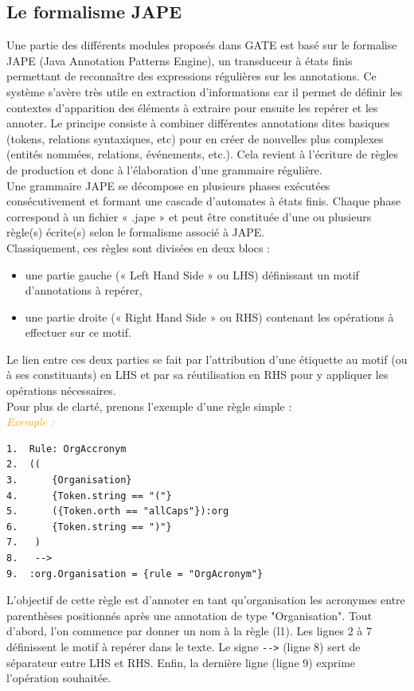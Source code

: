 \documentclass[a4paper, 11pt]{report}
\newenvironment{exemple}
    {
    \textit{\textcolor{orange}{
    Exemple : \\}}
    }
    {~\\
    }
\begin{document}
\subsection{Le formalisme JAPE}
Une partie des différents modules proposés dans GATE est basé sur le formalise JAPE (Java Annotation Patterns Engine), un transduceur à états finis permettant de reconnaître des expressions régulières sur les annotations. Ce système s'avère très utile en extraction d'informations car il permet de définir les contextes d'apparition des éléments à extraire pour ensuite les repérer et les annoter. Le principe consiste à combiner différentes annotations dites basiques (tokens, relations syntaxiques, etc) pour en créer de nouvelles plus complexes (entités nommées, relations, événements, etc.). Cela revient à l'écriture de règles de production et donc à l'élaboration d'une grammaire régulière.\\
Une grammaire JAPE se décompose en plusieurs phases exécutées consécutivement et formant une cascade d'automates à états finis. Chaque phase correspond à un fichier « .jape » et peut être constituée d'une ou plusieurs règle(s) écrite(s) selon le formalisme associé à JAPE.\cite{SL10}\\
Classiquement, ces règles sont divisées en deux blocs : 
\begin{itemize}
\item une partie gauche (« Left Hand Side » ou LHS) définissant un motif d'annotations à repérer,
\item une partie droite (« Right Hand Side » ou RHS) contenant les opérations à effectuer sur ce motif.
\end{itemize}
Le lien entre ces deux parties se fait par l'attribution d'une étiquette au motif (ou à ses constituants) en LHS et par sa réutilisation en RHS pour y appliquer les opérations nécessaires.\\
Pour plus de clarté, prenons l'exemple d'une règle simple :\\
\begin{exemple}
\begin{verbatim}
1.  Rule: OrgAccronym
2.  ((
3.      {Organisation}
4.      {Token.string == "("}
5.      ({Token.orth == "allCaps"}):org
6.      {Token.string == ")"}
7.   )
8.   -->
9.  :org.Organisation = {rule = "OrgAcronym"}
\end{verbatim}

L'objectif de cette règle est d'annoter en tant qu'organisation les acronymes entre parenthèses positionnés après une annotation de type "Organisation". Tout d'abord, l'on commence par donner un nom à la règle (l1). Les lignes 2 à 7 définissent le motif à repérer dans le texte. Le signe \verb|-->| (ligne 8) sert de séparateur entre LHS et RHS. Enfin, la dernière ligne (ligne 9) exprime l'opération souhaitée.
\end{exemple}
\end{document}
